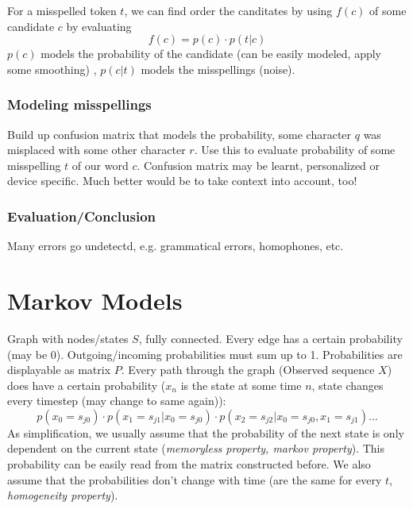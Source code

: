 \documentclass[11pt]{article}
\begin{document}
For a misspelled token $t$, we can find order the canditates by using $f(c)$ of some 
candidate $c$ by evaluating
\begin{equation}
	f(c) = p(c) \cdot p(t|c)
\end{equation}
$p(c)$ models the probability of the candidate (can be easily modeled, apply some smoothing)
, $p(c|t)$ models the misspellings (noise). 
\subsubsection{Modeling misspellings}
\label{ssub:model_misspellings}
Build up confusion matrix that models the probability, some character $q$ was misplaced with some other character $r$. Use this to evaluate probability of some misspelling $t$ of our word $c$. Confusion matrix may be learnt, personalized or device specific. Much better would be to take context into account, too!


\subsubsection{Evaluation/Conclusion}
Many errors go undetectd, e.g. grammatical errors, homophones, etc.

\section{Markov Models}
\label{sec:markov_models}
Graph with nodes/states $S$, fully connected. Every edge has a certain probability 
(may be 0). Outgoing/incoming probabilities must sum up to 1. Probabilities are displayable 
as matrix $P$. Every path through the graph (Observed sequence $X$) does have a certain probability ($x_n$ is the state
at some time $n$, state changes every timestep (may change to same again)):
\begin{equation}
	p(x_0 = s_{j0}) \cdot p(x_1 = s_{j1} |x_0 = s_{j0}) \cdot p(x_2 = s_{j2} | x_0 = s_{j0}, x_1 = s_{j1})\ldots
\end{equation}
As simplification, we usually assume that the probability of the 
next state is only dependent on the current state (\emph{memoryless property, markov property}). This probability can be easily read from the matrix constructed before.
We also assume that the probabilities don't change with time (are the same for every $t$, \emph{homogeneity property}).
\end{document}

